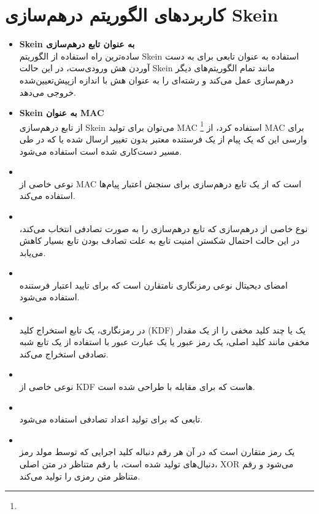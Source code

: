 \section{کاربردهای الگوریتم درهم‌سازی Skein}
\begin{itemize}
	
	\item \textbf{Skein به عنوان تابع درهم‌سازی}\\
	      ساده‌ترین راه استفاده از الگوریتم Skein استفاده به عنوان تابعی برای به دست آوردن هش ورودی‌ست، در این حالت Skein مانند تمام الگوریتم‌های دیگر درهم‌سازی عمل می‌کند و رشته‌ای را به عنوان هش با اندازه ازپیش‌تعیین‌شده خروجی می‌دهد.
	\item \textbf{Skein به عنوان MAC}\\
	      از تابع درهم‌سازی Skein می‌توان برای تولید MAC
	      \footnote{}
	      استفاده کرد، از 
	      MAC 
	      برای وارسی این که یک پیام از یک فرستنده معتبر بدون تغییر ارسال شده یا که در طی مسیر دست‌کاری شده است استفاده می‌شود. 
	\item {}\\
	نوعی خاصی از MAC است که از یک تابع درهم‌سازی برای سنجش اعتبار پیام‌ها استفاده می‌کند.
	\item \textbf{}\\
	نوع خاصی از درهم‌سازی که تابع درهم‌سازی را به صورت تصادفی انتخاب می‌کند،‌ در این حالت احتمال شکستن امنیت تابع به علت تصادف بودن تابع بسیار کاهش می‌یابد.
	\item \textbf{}\\
	امضای دیحیتال نوعی رمزنگاری نامتقارن است که برای تایید اعتبار فرستنده استفاده می‌شود.
	\item \textbf{}\\
	در رمزنگاری، یک تابع استخراج کلید (KDF) یک یا چند کلید مخفی را از یک مقدار مخفی مانند کلید اصلی، یک رمز عبور یا یک عبارت عبور با استفاده از یک تابع شبه تصادفی استخراج می‌کند.
	\item \textbf{}\\
	نوعی خاصی از KDF هاست که برای مقابله با  
	طراحی شده است.
	\item \textbf{}\\
	تابعی که برای تولید اعداد تصادفی استفاده می‌شود.
	\item \textbf{}\\
	یک رمز متقارن است که در آن هر رقم دنباله کلید اجرایی که توسط مولد رمز دنبال‌های تولید شده است، با رقم متناظر در متن اصلی، XOR می‌شود و رقم متناظر متن رمزی را تولید می‌کند.
\end{itemize}
